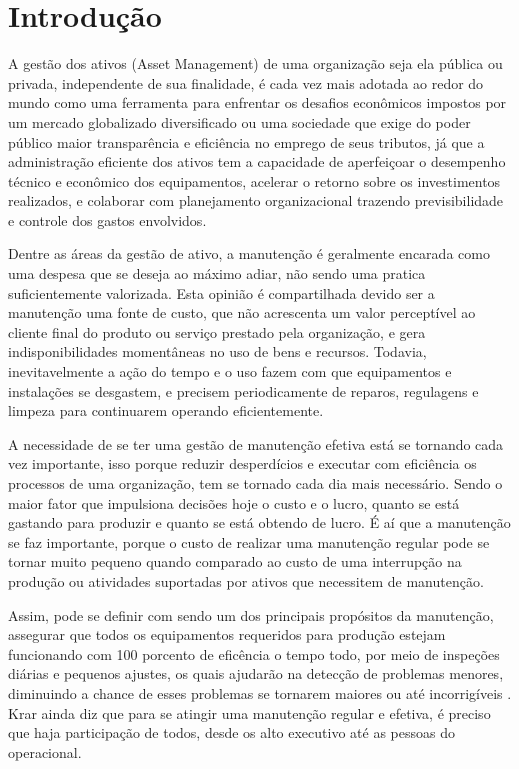 \chapter{Introdução}
\label{cap-introducao}

A gestão dos ativos (Asset Management) de uma organização seja ela pública ou privada, independente de sua finalidade, é cada vez mais adotada ao redor do mundo como uma ferramenta para enfrentar os desafios econômicos impostos por um mercado globalizado diversificado ou uma sociedade que exige do poder público maior transparência e eficiência no emprego de seus tributos, já que a administração eficiente dos ativos tem a capacidade de aperfeiçoar o desempenho técnico e econômico dos equipamentos, acelerar o retorno sobre os investimentos realizados, e colaborar com planejamento organizacional trazendo previsibilidade e controle dos gastos envolvidos. 

Dentre as áreas da gestão de ativo, a manutenção é geralmente encarada como uma despesa que se deseja ao máximo adiar, não sendo uma pratica suficientemente valorizada. Esta opinião é compartilhada devido ser a manutenção uma fonte de custo, que não acrescenta um valor perceptível ao cliente final do produto ou serviço prestado pela organização, e gera indisponibilidades momentâneas no uso de bens e recursos.
Todavia, inevitavelmente a ação do tempo e o uso fazem com que equipamentos e instalações se desgastem, e precisem periodicamente de reparos, regulagens e limpeza para continuarem operando eficientemente.

A necessidade de se ter uma gestão de manutenção efetiva está se tornando cada vez importante, isso porque  reduzir desperdícios e executar com eficiência os processos de uma organização, tem se tornado cada dia mais necessário. Sendo o maior fator que impulsiona decisões hoje o custo e o lucro, quanto se está gastando para produzir e quanto se está obtendo de lucro. É aí que a manutenção se faz importante, porque o custo de realizar uma manutenção regular pode se tornar muito pequeno quando comparado ao custo de uma interrupção na produção ou atividades suportadas por ativos que necessitem de manutenção.

Assim, pode se definir com sendo um dos principais propósitos da manutenção, assegurar que todos os equipamentos requeridos para produção estejam funcionando com 100 porcento de eficência o tempo todo, por meio de inspeções diárias e pequenos ajustes, os quais ajudarão na detecção de problemas menores, diminuindo a chance de esses problemas se tornarem maiores ou até incorrigíveis \cite{krar2009}. Krar ainda diz que para se atingir uma manutenção regular e efetiva, é preciso que haja participação de todos, desde os alto executivo até as pessoas do operacional.

